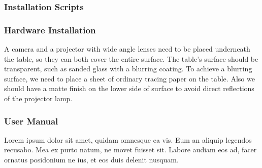 \subsubsection{Installation Scripts}
\subsubsection{Hardware Installation}
A camera and a projector with wide angle lenses need to be placed underneath the table, so they can both cover the entire surface. The table's surface should be transparent, such as sanded glass with a blurring coating. To achieve a blurring surface, we need to place a sheet of ordinary tracing paper on the table. Also we should have a matte finish on the lower side of surface to avoid direct reflections of the projector lamp. 

\subsubsection{User Manual}
Lorem ipsum dolor sit amet, quidam omnesque ea vis. Eum an aliquip legendos recusabo. Mea ex purto natum, ne movet fuisset sit. Labore audiam eos ad, facer ornatus posidonium ne ius, et eos duis delenit nusquam.
